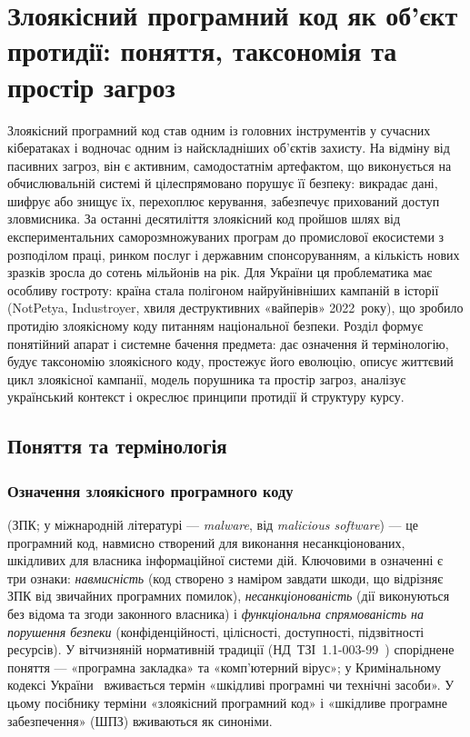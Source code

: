 \chapter{Злоякісний програмний код як об'єкт протидії: поняття, таксономія та простір загроз}
\label{chap:ch01}

Злоякісний програмний код став одним із головних інструментів у сучасних кібератаках і водночас одним із найскладніших об'єктів захисту. На відміну від пасивних загроз, він є активним, самодостатнім артефактом, що виконується на обчислювальній системі й цілеспрямовано порушує її безпеку: викрадає дані, шифрує або знищує їх, перехоплює керування, забезпечує прихований доступ зловмисника. За останні десятиліття злоякісний код пройшов шлях від експериментальних саморозмножуваних програм до промислової екосистеми з розподілом праці, ринком послуг і державним спонсоруванням, а кількість нових зразків зросла до сотень мільйонів на рік. Для України ця проблематика має особливу гостроту: країна стала полігоном найруйнівніших кампаній в історії (NotPetya, Industroyer, хвиля деструктивних «вайперів» 2022~року), що зробило протидію злоякісному коду питанням національної безпеки. Розділ формує понятійний апарат і системне бачення предмета: дає означення й термінологію, будує таксономію злоякісного коду, простежує його еволюцію, описує життєвий цикл злоякісної кампанії, модель порушника та простір загроз, аналізує український контекст і окреслює принципи протидії й структуру курсу.

\section{Поняття та термінологія}\label{sec:ch01-terms}

\subsection{Означення злоякісного програмного коду}

 (ЗПК; у міжнародній літературі --- \emph{malware}, від \emph{malicious software}) --- це програмний код, навмисно створений для виконання несанкціонованих, шкідливих для власника інформаційної системи дій. Ключовими в означенні є три ознаки: \emph{навмисність} (код створено з наміром завдати шкоди, що відрізняє ЗПК від звичайних програмних помилок), \emph{несанкціонованість} (дії виконуються без відома та згоди законного власника) і \emph{функціональна спрямованість на порушення безпеки} (конфіденційності, цілісності, доступності, підзвітності ресурсів). У вітчизняній нормативній традиції (НД~ТЗІ~1.1-003-99~\cite{ndtzi-1-1-003}) споріднене поняття --- «програмна закладка» та «комп'ютерний вірус»; у Кримінальному кодексі України~\cite{kk-ukr} вживається термін «шкідливі програмні чи технічні засоби». У цьому посібнику терміни «злоякісний програмний код» і «шкідливе програмне забезпечення» (ШПЗ) вживаються як синоніми.

